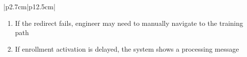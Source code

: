 \begin{table}[H]
\begin{tabular}{|p{2.7cm}|p{12.5cm}|}
\begin{minipage}[t]{\linewidth}
\begin{enumerate}[topsep=0pt,itemsep=1pt,parsep=0pt,partopsep=0pt]
                                              \item If the redirect fails, engineer may need to manually navigate to the training
                                                    path
                                              \item If enrollment activation is delayed, the system shows a processing message
                                          \end{enumerate}
                                      \end{minipage} \\
            \hline
        \end{tabular}
        \label{tab:eng-payment-success}
    \end{table}
